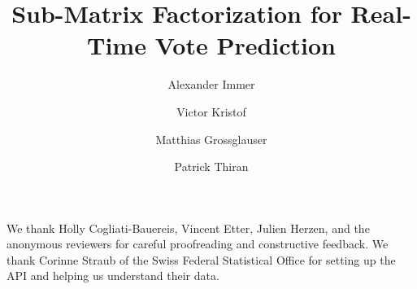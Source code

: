 \documentclass[sigconf]{acmart}
\begin{document}
\fancyhead{}

\title{Sub-Matrix Factorization for Real-Time Vote Prediction}

\author{Alexander Immer}

\author{Victor Kristof}
\authornotemark[1]

\author{Matthias Grossglauser}

\author{Patrick Thiran}

\renewcommand{\shortauthors}{Immer and Kristof, et al.}



\maketitle









\begin{acks}
We thank Holly Cogliati-Bauereis, Vincent Etter, Julien Herzen, and the anonymous reviewers for careful proofreading and constructive feedback.
We thank Corinne Straub of the Swiss Federal Statistical Office for setting up the API and helping us understand their data.
\end{acks}




\newpage
\clearpage
\appendix

\end{document}
